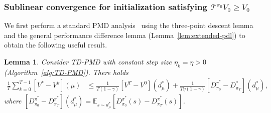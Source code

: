 \documentclass[10pt]{article}
\newcommand{\E}{\mathbb{E}}
\theoremstyle{plain}
\newtheorem{lemma}[theorem]{Lemma}
\theoremstyle{definition}
\begin{document}
\subsubsection{Sublinear convergence for initialization satisfying $\mathcal{T}^{\pi_0}V_0\geq V_0$}
\label{sec:sublinear-convergence-spec-init}
{We first perform a standard PMD analysis~\cite{Xiao_2022,Lan_2021} using the three-point descent lemma~\cite{chen1993convergence} and the general performance difference lemma (Lemma~\ref{lem:extended-pdl}) to obtain the following useful result.}
\begin{lemma}
    Consider TD-PMD with constant step size $\eta_k=\eta>0$ (Algorithm~\ref{alg:TD-PMD}). There holds
    \begin{align}
        \frac{1}{T}\sum_{k=0}^{T-1} [V^* - V^k](\mu) &\leq \frac{1}{T(1-\gamma)} [V^{T} - V^0](d^*_\mu) + \frac{1}{T\eta(1-\gamma)}[D^{\pi^*}_{\pi_0} - D^*_{\pi_{T}}](d^*_\mu), \label{eq:TD-PMD-error-upper-bound-1}
    \end{align}
    where $[D^{\pi^*}_{\pi_{0}} - D^{\pi^*}_{\pi_T}](d^*_\mu) = \E_{s\sim d^*_\mu} [D^{\pi^*}_{\pi_{0}}(s) - D^{\pi^*}_{\pi_T}(s)]$.
    \label{lem:sublinear-convergence-lemma}
\end{lemma}
\end{document}
